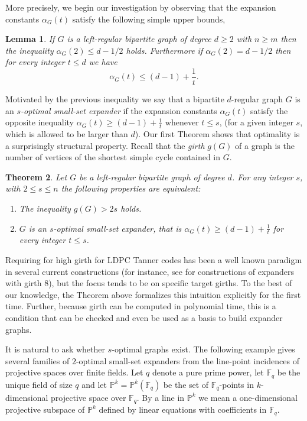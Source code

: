\documentclass[12pt]{amsart}
\newtheorem{lemma}{Lemma}[section]
\newtheorem{theorem}[lemma]{Theorem}
\theoremstyle{definition}
\renewcommand{\geq}{\geqslant}
\renewcommand{\leq}{\leqslant}
\newcommand{\PP}{\ensuremath{\mathbb{P}}}
\newcommand{\FF}{\ensuremath{\mathbb{F}}}
\newcommand{\1}{\ensuremath{\mathbb{1}}}
\begin{document}
More precisely, we begin our investigation by observing that the expansion constants $\alpha_G(t)$ satisfy the following simple upper bounds,

\begin{lemma}\label{Lem: UpperBound} If $G$ is a left-regular bipartite graph of degree $d\geq 2$ with $n\geq m$ then the inequality $\alpha_G(2)\leq d-1/2$ holds. Furthermore if $\alpha_G(2)= d-1/2$ then for every integer $t\leq d$ we have
\[\alpha_G(t)\leq (d-1)+\frac{1}{t}.\]
\end{lemma}

Motivated by the previous inequality we say that a bipartite $d$-regular graph $G$ is an \emph{$s$-optimal small-set expander} if the expansion constants $\alpha_G(t)$ satisfy the opposite inequality $\alpha_G(t)\geq (d-1)+\frac{1}{t}$ whenever $t\leq s$, (for a given integer $s$, which is allowed to be larger than $d$). Our first Theorem shows that optimality is a surprisingly structural property. Recall that the \emph{girth} $g(G)$ of a graph is the number of vertices of the shortest simple cycle contained in $G$. 

\begin{theorem}\label{Thm: girth} Let $G$ be a left-regular bipartite graph of degree $d$. For any integer $s$, with $2\leq s\leq n$ the following properties are equivalent:
\begin{enumerate}
\item The inequality $g(G)>2s$ holds.
\item $G$ is an $s$-optimal small-set expander, that is
$\alpha_G(t)\geq (d-1)+\frac{1}{t}$ for every integer $t\leq s$.
\end{enumerate}
\end{theorem} 

Requiring for high girth for LDPC Tanner codes has been a well known paradigm in several current constructions (for instance, see \cite{Rabeti} for constructions of expanders with girth $8$), but the focus tends to be on specific target girths. To the best of our knowledge, the Theorem above formalizes this intuition explicitly for the first time. Further, because girth can be computed in polynomial time, this is a condition that can be checked and even be used as a basis to build expander graphs.

It is natural to ask whether $s$-optimal graphs exist. The following example gives several families of $2$-optimal small-set expanders from the line-point incidences of projective spaces over finite fields. Let $q$ denote a pure prime power, let $\FF_q$ be the unique field of size $q$ and let $\PP^k = \PP^k(\FF_q)$ be the set of $\FF_q$-points in $k$-dimensional projective space over $\FF_q$. By a line in $\PP^k$ we mean a one-dimensional projective subspace of $\PP^k$ defined by linear equations with coefficients in $\FF_q$.
\end{document}
